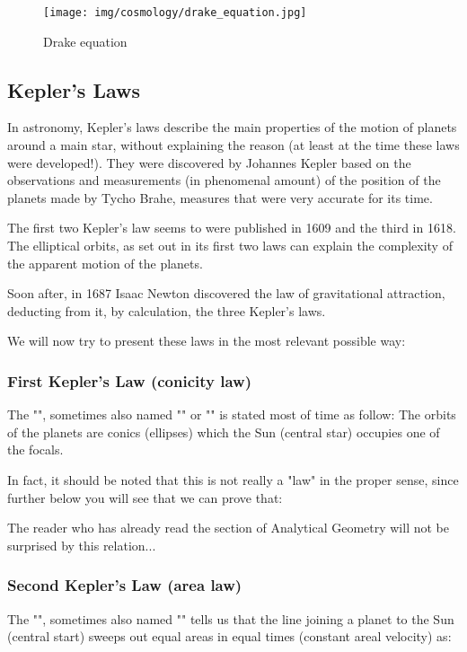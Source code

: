 	\begin{figure}[H]
		\centering
		\texttt{[image: img/cosmology/drake\_equation.jpg]}	
		\caption{Drake equation}
	\end{figure}
	
	\pagebreak
	\subsection{Kepler's Laws}\label{kepler laws}
	In astronomy, Kepler's laws describe the main properties of the motion of planets around a main star, without explaining the reason (at least at the time these laws were developed!). They were discovered by Johannes Kepler based on the observations and measurements (in phenomenal amount) of the position of the planets made by Tycho Brahe, measures that were very accurate for its time.
	
	The first two Kepler's law seems to were published in 1609 and the third in 1618. The elliptical orbits, as set out in its first two laws can explain the complexity of the apparent motion of the planets.
	
	Soon after, in 1687 Isaac Newton discovered the law of gravitational attraction, deducting from it, by calculation, the three Kepler's laws.
	
	We will now try to present these laws in the most relevant possible way:
	
	\subsubsection{First Kepler's Law (conicity law)}\label{conicity law}
	The "", sometimes also named "" or "" is stated most of time as follow: The orbits of the planets are conics (ellipses) which the Sun (central star) occupies one of the focals.
	
	In fact, it should be noted that this is not really a "law" in the proper sense, since further below you will see that we can prove that:
	
	
	\begin{tcolorbox}[title=Remark,colframe=black,arc=10pt]
	The reader who has already read the section of Analytical Geometry will not be surprised by this relation...
	\end{tcolorbox}
	
	\subsubsection{Second Kepler's Law (area law)}
	The "\label{kepler second law}", sometimes also named "" tells us that the line joining a planet to the Sun (central start) sweeps out equal areas in equal times (constant areal velocity\label{constant areal velocity}) as:
	
